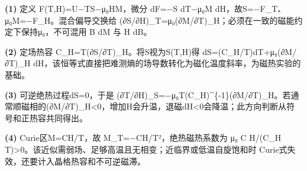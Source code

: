 \par\noindent\textbf{(1)} 定义 F(T,H)=U−TS−μ₀HM，微分 dF=−S dT−μ₀M dH，故S=−F\_T、μ₀M=−F\_H。混合偏导交换给 (∂S/∂H)\_T=μ₀(∂M/∂T)\_H；必须在一致的磁能约定下保持μ₀，不可混用 B dM 与 H dB。
\par\noindent\textbf{(2)} 定场热容 C\_H=T(∂S/∂T)\_H。将S视为S(T,H)得 dS=(C\_H/T)dT+μ₀(∂M/∂T)\_H dH，该恒等式直接把难测熵的场导数转化为磁化温度斜率，为磁热实验的基础。
\par\noindent\textbf{(3)} 可逆绝热过程dS=0，于是 (∂T/∂H)\_S=−μ₀T(C\_H)\textasciicircum{}\{-1\}(∂M/∂T)\_H。若通常顺磁相的(∂M/∂T)\_H<0，增加H会升温，退磁dH<0会降温；此方向判断从符号和正热容共同得出。
\par\noindent\textbf{(4)} Curie区M=CH/T，故 M\_T=−CH/T²，绝热磁热系数为 μ₀ C H/(C\_H T)>0。该近似需弱场、足够高温且无相变；近临界或低温自旋饱和时 Curie式失效，还要计入晶格热容和不可逆磁滞。
